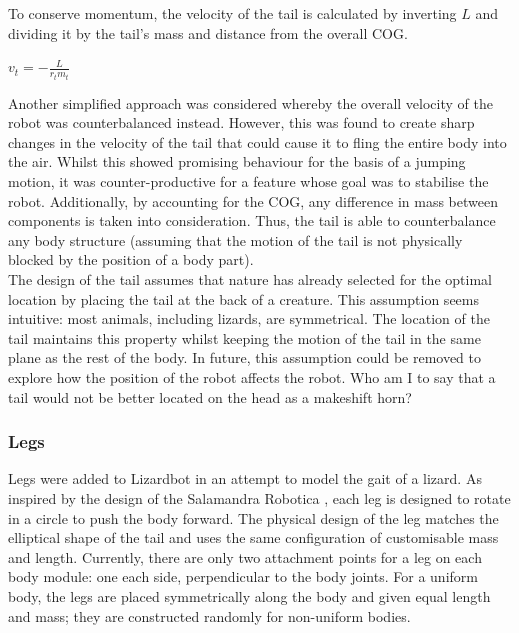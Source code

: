 \documentclass{article}
\begin{document}
To conserve momentum, the velocity of the tail is calculated by inverting $L$ and dividing it by the tail's mass and distance from the overall COG.
\begin{center}
\begin{Large}
$v_{t} = - \frac{L}{r_{t}m_{t}}$\\
\end{Large}
\end{center}

Another simplified approach was considered whereby the overall velocity of the robot was counterbalanced instead. However, this was found to create sharp changes in the velocity of the tail that could cause it to fling the entire body into the air. Whilst this showed promising behaviour for the basis of a jumping motion, it was counter-productive for a feature whose goal was to stabilise the robot. Additionally, by accounting for the COG, any difference in mass between components is taken into consideration. Thus, the tail is able to counterbalance any body structure (assuming that the motion of the tail is not physically blocked by the position of a body part).\\

The design of the tail assumes that nature has already selected for the optimal location by placing the tail at the back of a creature. This assumption seems intuitive: most animals, including lizards, are symmetrical. The location of the tail maintains this property whilst keeping the motion of the tail in the same plane as the rest of the body. In future, this assumption could be removed to explore how the position of the robot affects the robot. Who am I to say that a tail would not be better located on the head as a makeshift horn?

\subsubsection{Legs}
\label{sec:Legs Imp}
Legs were added to Lizardbot in an attempt to model the gait of a lizard.
As inspired by the design of the Salamandra Robotica , each leg is designed to rotate in a circle to push the body forward. The physical design of the leg matches the elliptical shape of the tail and uses the same configuration of customisable mass and length. 
Currently, there are only two attachment points for a leg on each body module: one each side, perpendicular to the body joints. For a uniform body, the legs are placed symmetrically along the body and given equal length and mass; they are constructed randomly for non-uniform bodies. \\
\end{document}
